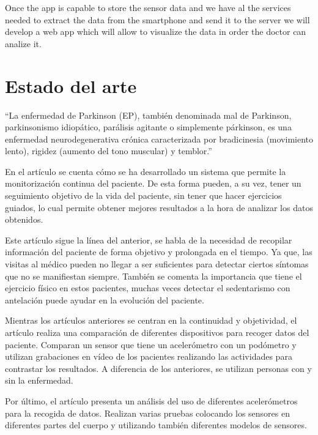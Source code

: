 \documentclass[11pt,spanish]{article}
\begin{document}
Once the app is capable to store the sensor data and we have al the services needed to extract the data from the smartphone and send it to the server we will develop a web app which will allow to visualize the data in order the doctor can analize it.
\newpage

\section{Estado del arte}
“La enfermedad de Parkinson (EP), también denominada mal de Parkinson, parkinsonismo idiopático, parálisis agitante o simplemente párkinson, es una enfermedad neurodegenerativa crónica caracterizada por bradicinesia (movimiento lento), rigidez (aumento del tono muscular) y temblor.” \cite{Wikipedia} 
\newline

En el artículo \cite{resumen1} se cuenta cómo se ha desarrollado un sistema que permite la monitorización continua del paciente. De esta forma pueden, a su vez, tener un seguimiento objetivo de la vida del paciente, sin tener que hacer ejercicios guiados, lo cual permite obtener mejores resultados a la hora de analizar los datos obtenidos. 
\newline

Este artículo \cite{resumen2} sigue la línea del anterior, se habla de la necesidad de recopilar información del paciente de forma objetivo y prolongada en el tiempo. Ya que, las visitas al médico pueden no llegar a ser suficientes para detectar ciertos síntomas que no se manifiestan siempre. También se comenta la importancia que tiene el ejercicio físico en estos pacientes, muchas veces detectar el sedentarismo con antelación puede ayudar en la evolución del paciente.
\newline

Mientras los artículos anteriores se centran en la continuidad y objetividad, el artículo \cite{resumen3} realiza una comparación de diferentes dispositivos para recoger datos del paciente. Comparan un sensor que tiene un acelerómetro con un podómetro y utilizan grabaciones en vídeo de los pacientes realizando las actividades para contrastar los resultados. A diferencia de los anteriores, se utilizan personas con y sin la enfermedad.
\newline

Por último, el artículo \cite{resumen4} presenta un análisis del uso de diferentes acelerómetros para la recogida de datos. Realizan varias pruebas colocando los sensores en diferentes partes del cuerpo y utilizando también diferentes modelos de sensores.
\newline
\end{document}
